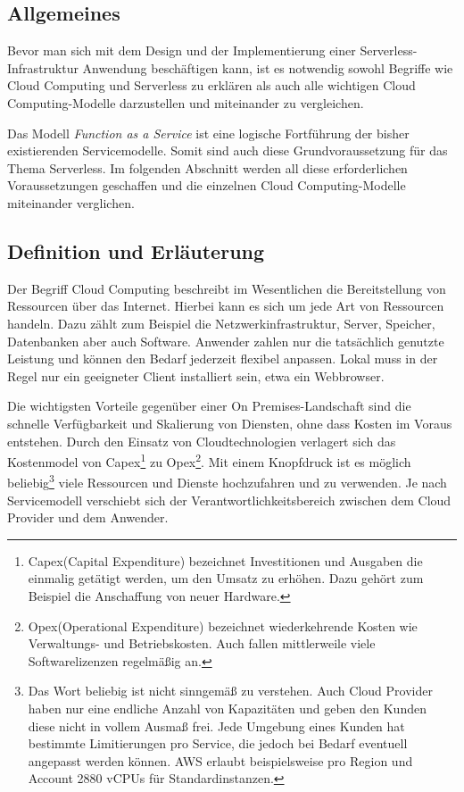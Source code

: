 \subsection{Allgemeines}

Bevor man sich mit dem Design und der Implementierung einer Serverless-Infrastruktur Anwendung beschäftigen kann, ist es notwendig sowohl Begriffe wie Cloud Computing und Serverless zu erklären als auch alle wichtigen Cloud Computing-Modelle darzustellen und miteinander zu vergleichen.

Das Modell \textsl{Function as a Service} ist eine logische Fortführung der bisher existierenden Servicemodelle.
Somit sind auch diese Grundvoraussetzung für das Thema Serverless.
Im folgenden Abschnitt werden all diese erforderlichen Voraussetzungen geschaffen und die einzelnen Cloud Computing-Modelle miteinander verglichen.


\subsection{Definition und Erläuterung}
Der Begriff Cloud Computing beschreibt im Wesentlichen die Bereitstellung von Ressourcen über das Internet.
Hierbei kann es sich um jede Art von Ressourcen handeln. Dazu zählt zum Beispiel die Netzwerkinfrastruktur, Server, Speicher, Datenbanken aber auch Software.
Anwender zahlen nur die tatsächlich genutzte Leistung und können den Bedarf jederzeit flexibel anpassen.
Lokal muss in der Regel nur ein geeigneter Client installiert sein, etwa ein Webbrowser.

Die wichtigsten Vorteile gegenüber einer On Premises-Landschaft sind die schnelle Verfügbarkeit und Skalierung von Diensten, ohne dass Kosten im Voraus entstehen.
Durch den Einsatz von Cloudtechnologien verlagert sich das Kostenmodel von Capex\footnote{ Capex(Capital Expenditure) bezeichnet Investitionen und Ausgaben die einmalig getätigt werden,
um den Umsatz zu erhöhen. Dazu gehört zum Beispiel die Anschaffung von neuer Hardware. } zu Opex\footnote{Opex(Operational Expenditure) bezeichnet wiederkehrende Kosten wie Verwaltungs- und Betriebskosten.
Auch fallen mittlerweile viele Softwarelizenzen regelmäßig an.}.
Mit einem Knopfdruck ist es möglich beliebig\footnote{Das Wort beliebig ist nicht sinngemäß zu verstehen.
Auch Cloud Provider haben nur eine endliche Anzahl von Kapazitäten und geben den Kunden diese nicht in vollem Ausmaß frei.
Jede Umgebung eines Kunden hat bestimmte Limitierungen pro Service, die jedoch bei Bedarf eventuell angepasst werden können.
AWS erlaubt beispielsweise pro Region und Account 2880 vCPUs für Standardinstanzen. } viele Ressourcen und Dienste hochzufahren und zu verwenden.
Je nach Servicemodell verschiebt sich der Verantwortlichkeitsbereich zwischen dem Cloud Provider und dem Anwender.
\cite{CloudComputingDef}

